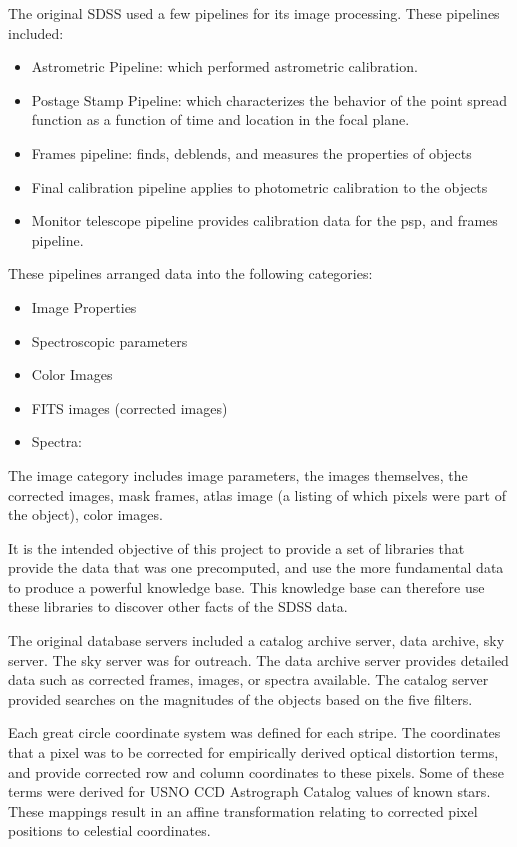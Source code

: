 \documentclass[11pt]{article}
\begin{document}
The original SDSS used a few pipelines for its image processing.  These pipelines included:
\begin{itemize}
\item Astrometric Pipeline: which performed astrometric calibration.  
\item Postage Stamp Pipeline: which characterizes the behavior of the point spread function as a function of time and location in the focal plane.
\item Frames pipeline: finds, deblends, and measures the properties of objects
\item Final calibration pipeline applies to photometric calibration to the objects
\item Monitor telescope pipeline provides calibration data for the psp, and frames pipeline.  
\end{itemize}
These pipelines arranged data into the following categories:
\begin{itemize}
\item Image Properties
\item Spectroscopic parameters
\item Color Images
\item FITS images (corrected images)
\item Spectra:
\end{itemize}

The image category includes image parameters, the images themselves, the corrected images, mask frames, atlas image (a listing of which pixels were part of the object),  color images.  

It is the intended objective of this project to provide a set of libraries that provide the data that was one precomputed, and use the more fundamental data to produce a powerful knowledge base.  This knowledge base can therefore use these libraries to discover other facts of the SDSS data.    

The original database servers included a catalog archive server, data archive, sky server.  The sky server was for outreach.  The data archive server provides detailed data such as corrected frames, images, or spectra available.  The catalog server provided searches on the magnitudes of the objects based on the five filters.  

Each great circle coordinate system was defined for each stripe.  The coordinates that a pixel was to be corrected for empirically derived optical distortion terms, and provide corrected row and column coordinates to these pixels.   Some of these terms were derived for USNO CCD Astrograph Catalog values of known stars. These mappings result in an affine transformation relating to corrected pixel positions to celestial coordinates.  
\end{document}
